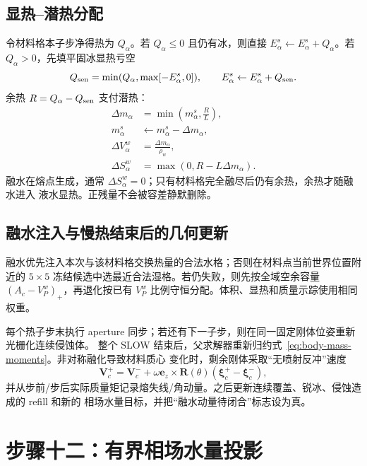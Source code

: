 \documentclass[UTF8,zihao=-4]{ctexart}
\newcommand{\vect}[1]{\boldsymbol{#1}}
\newcommand{\cellarea}{A_c}
\numberwithin{equation}{section}
\begin{document}
\subsection{显热--潜热分配}

令材料格本子步净得热为 $Q_\alpha$。若 $Q_\alpha\le0$ 且仍有冰，则直接
$E_\alpha^s\leftarrow E_\alpha^s+Q_\alpha$。若 $Q_\alpha>0$，先填平固冰显热亏空
\begin{equation}
  Q_{\rm sen}=\min(Q_\alpha,\max[-E_\alpha^s,0]),
  \qquad E_\alpha^s\leftarrow E_\alpha^s+Q_{\rm sen}.
\end{equation}
余热 $R=Q_\alpha-Q_{\rm sen}$ 支付潜热：
\begin{align}
  \Delta m_\alpha&=\min\left(m_\alpha^s,\frac{R}{L}\right),\\
  m_\alpha^s&\leftarrow m_\alpha^s-\Delta m_\alpha,\\
  \Delta V_\alpha^w&=\frac{\Delta m_\alpha}{\rho_w},\\
  \Delta S_\alpha^w&=\max(0,R-L\Delta m_\alpha).
  \label{eq:melt-update}
\end{align}
融水在熔点生成，通常 $\Delta S_\alpha^w=0$；只有材料格完全融尽后仍有余热，余热才随融水进入
液水显热。正残量不会被容差静默删除。

\subsection{融水注入与慢热结束后的几何更新}

融水优先注入本次与该材料格交换热量的合法水格；否则在材料点当前世界位置附近的
$5\times5$ 冻结候选中选最近合法湿格。若仍失败，则先按全域空余容量
$(\cellarea-V_P^w)_+$，再退化按已有 $V_P^w$ 比例守恒分配。体积、显热和质量示踪使用相同权重。

每个热子步末执行 aperture 同步；若还有下一子步，则在同一固定刚体位姿重新光栅化连续侵蚀体。
整个 SLOW 结束后，父求解器重新归约式~\eqref{eq:body-mass-moments}。非对称融化导致材料质心
变化时，剩余刚体采取“无喷射反冲”速度
\begin{equation}
  \vect V_c^+=\vect V_c^-+\omega\vect e_z\times
  \vect R(\theta)(\vect\xi_c^+-\vect\xi_c^-),
  \label{eq:no-ejection-recoil}
\end{equation}
并从步前/步后实际质量矩记录熔失线/角动量。之后更新连续覆盖、锐冰、侵蚀造成的 refill 和新的
相场水量目标，并把“融水动量待闭合”标志设为真。

\section{步骤十二：有界相场水量投影}
\end{document}
